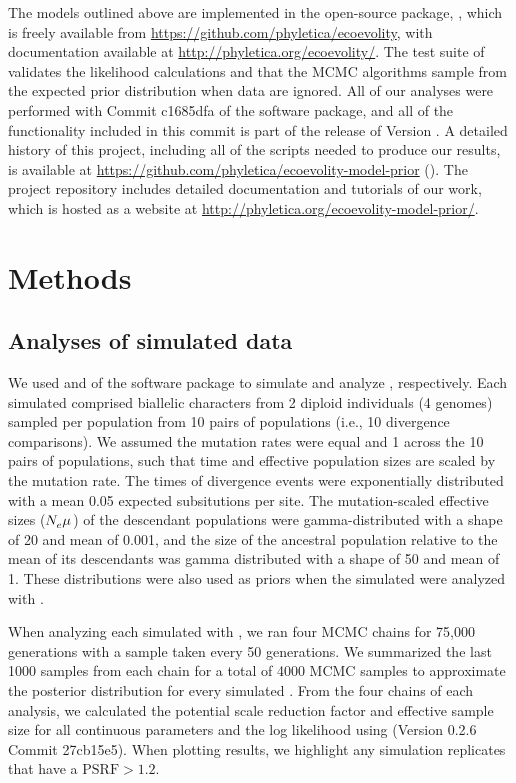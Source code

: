 \documentclass[letterpaper,12pt]{article}
\begin{document}
The models outlined above are implemented in the open-source \cpp package,
\ecoevolity, which is freely available from
\url{https://github.com/phyletica/ecoevolity}, with documentation available
at
\url{http://phyletica.org/ecoevolity/}.
The test suite of \ecoevolity
validates the likelihood calculations and that the MCMC algorithms sample from
the expected prior distribution when data are ignored.
All of our analyses were performed with
Commit c1685dfa
of the \ecoevolity software package,
and all of the functionality included in this commit is part of
the release of Version .
A detailed history of this project, including all of the scripts
needed to produce our results, is available at
\url{https://github.com/phyletica/ecoevolity-model-prior}
().
The project repository includes detailed documentation and tutorials of our
work, which is hosted as a website at
\url{http://phyletica.org/ecoevolity-model-prior/}.

\section{Methods}

\subsection{Analyses of simulated data}

We used \simcoevolity and \ecoevolity of the \ecoevolity software
package
\citep[Version 0.3.2 Commit c1685dfa][]{Oaks2018ecoevolity}
to simulate and analyze \datasets, respectively.
Each simulated \dataset comprised biallelic characters from 2 diploid
individuals (4 genomes) sampled per population from 10 pairs of populations
(i.e., 10 divergence comparisons).
We assumed the mutation rates were equal and 1 across the 10 pairs of
populations, such that time and effective population sizes are scaled by the
mutation rate.
The times of divergence events were exponentially distributed with a mean 0.05
expected subsitutions per site.
The mutation-scaled effective sizes ($N_{e}^{}\mu_{}$) of the descendant
populations were gamma-distributed with a shape of 20 and mean of 0.001,
and the size of the ancestral population relative to the mean of its
descendants was gamma distributed with a shape of 50 and mean of 1.
These distributions were also used as priors when the simulated \datasets were
analyzed with \ecoevolity.


When analyzing each simulated \dataset with \ecoevolity,
we ran four MCMC chains for 75,000 generations with a sample taken every 50
generations.
We summarized the last 1000 samples from each chain for a total of 4000 MCMC
samples to approximate the posterior distribution for every simulated \dataset.
From the four chains of each analysis, we calculated the potential
scale reduction factor \citep[PSRF; the square root of Equation 1.1
in][]{Brooks1998} and effective sample size \citep[ESS;][]{Gong2014} for all
continuous parameters and the log likelihood using
\pycoevolity (Version 0.2.6 Commit 27cb15e5).
When plotting results, we highlight any simulation replicates that have a
$\textrm{PSRF} > 1.2$.
\end{document}

